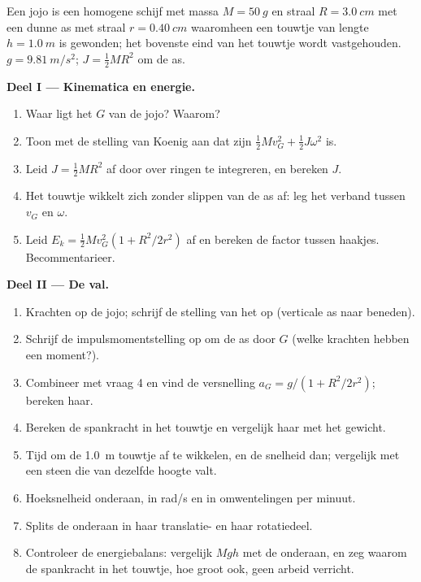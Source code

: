 \begin{problem}
\label{pb:b1:systems-of-points:1}
Een jojo is een homogene schijf met massa $M = \qty{50}{g}$ en straal $R =
\qty{3.0}{cm}$ met een dunne as met straal $r = \qty{0.40}{cm}$ waaromheen
een touwtje van lengte $h = \qty{1.0}{m}$ is gewonden; het bovenste eind van
het touwtje wordt vastgehouden. $g = \qty{9.81}{m/s^2}$; $J = \tfrac12 MR^2$ om de
as.

\medskip
\noindent\textbf{Deel I --- Kinematica en energie.}
\begin{enumerate}
  \item Waar ligt het  $G$ van de jojo? Waarom?
  \item Toon met de stelling van Koenig aan dat zijn  $\tfrac12
        Mv_G^2 + \tfrac12 J\omega^2$ is.
  \item Leid $J = \tfrac12 MR^2$ af door over ringen te integreren, en bereken
        $J$.
  \item Het touwtje wikkelt zich zonder slippen van de as af: leg het verband tussen
        $v_G$ en $\omega$.
  \item Leid $E_k = \tfrac12 Mv_G^2(1 + R^2/2r^2)$ af en bereken de
        factor tussen haakjes. Becommentarieer.
\end{enumerate}

\medskip
\noindent\textbf{Deel II --- De val.}
\begin{enumerate}[resume]
  \item Krachten op de jojo; schrijf de stelling van het  op
        (verticale as naar beneden).
  \item Schrijf de impulsmomentstelling op om de as door $G$
        (welke krachten hebben een moment?).
  \item Combineer met vraag 4 en vind de versnelling $a_G = g/(1 +
        R^2/2r^2)$; bereken haar.
  \item Bereken de spankracht in het touwtje en vergelijk haar met het gewicht.
  \item Tijd om de \qty{1.0}{m} touwtje af te wikkelen, en de snelheid dan;
        vergelijk met een steen die van dezelfde hoogte valt.
  \item Hoeksnelheid onderaan, in rad/s en in omwentelingen per minuut.
  \item Splits de  onderaan in haar translatie- en
        haar rotatiedeel.
  \item Controleer de energiebalans: vergelijk $Mgh$ met de 
        onderaan, en zeg waarom de spankracht in het touwtje, hoe groot ook,
        geen arbeid verricht.
\end{enumerate}


\end{problem}
